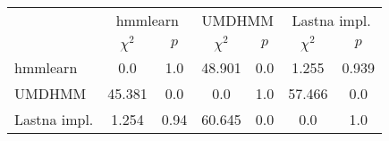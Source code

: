 \begin{table}
\centering
  \begin{tabular}{l cc cc cc}
    \toprule\multirow{2}{*}{}
      & \multicolumn{2}{c}{hmmlearn} & \multicolumn{2}{c}{UMDHMM} & \multicolumn{2}{c}{Lastna impl.} \\
      & $\chi^2$ & $p$ & $\chi^2$ & $p$ & $\chi^2$ & $p$ \\ \midrule
    hmmlearn & 0.0 & 1.0 & 48.901 & 0.0 & 1.255 & 0.939 \\
    UMDHMM & 45.381 & 0.0 & 0.0 & 1.0 & 57.466 & 0.0 \\
    Lastna impl. & 1.254 & 0.94 & 60.645 & 0.0 & 0.0 & 1.0 \\ \bottomrule
  \end{tabular}
  \caption{}
\label{tab:bench:nxn_comparison}
\end{table}
